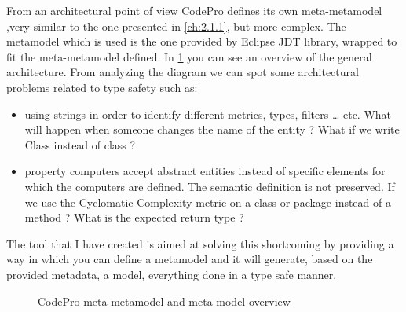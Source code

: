 	From an architectural point of view CodePro defines its own meta-metamodel 
,very similar to the one presented in \ref{ch:2.1.1}, but more complex. The
metamodel which is used is the one provided by Eclipse JDT library, wrapped to fit the
meta-metamodel defined. In \ref{fig:codeProUML} you can see an overview of the
general architecture. From analyzing the diagram we can spot some architectural 
problems related to type safety such as:
	\begin{itemize}
	  \item using strings in order to identify different metrics, types, filters 
 \ldots{} etc.  What will happen when someone changes the name of the entity ? 
 What if we write Class instead of class ? \\
	 
	  \item property computers accept abstract entities instead of specific 
elements for which the computers are defined. The semantic definition is not 
preserved. If we use the Cyclomatic Complexity metric on a class or package  
instead of a method ? What is the expected return type ? \\

	\end{itemize}
	The tool that I have created is aimed at solving this shortcoming by providing
a way in which you can define a metamodel and it will generate, based on the
provided metadata, a model, everything done in a type safe manner.

\begin{figure}
\centering
{}
\caption{CodePro meta-metamodel and meta-model overview}
\label{fig:codeProUML}
\end{figure}

